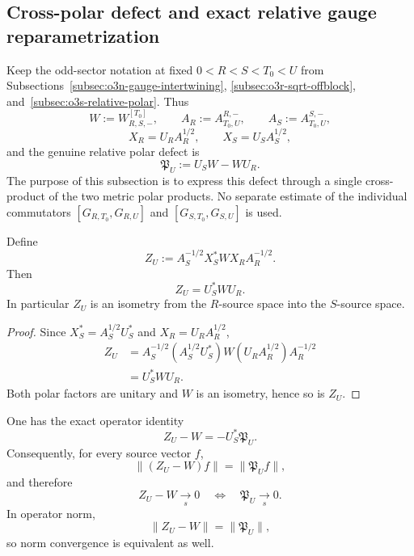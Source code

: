 
\subsection{Cross-polar defect and exact relative gauge reparametrization}
\label{subsec:o3t-crosspolar}

Keep the odd-sector notation at fixed $0<R<S<T_0<U$ from
Subsections~\ref{subsec:o3n-gauge-intertwining},
\ref{subsec:o3r-sqrt-offblock}, and~\ref{subsec:o3s-relative-polar}.  Thus
\[
 W:=W_{R,S,-}^{[T_0]},
 \qquad
 A_R:=A_{T_0,U}^{R,-},
 \qquad
 A_S:=A_{T_0,U}^{S,-},
\]
\[
 X_R=U_RA_R^{1/2},
 \qquad
 X_S=U_SA_S^{1/2},
\]
and the genuine relative polar defect is
\[
 \mathfrak P_U:=U_SW-WU_R.
\]
The purpose of this subsection is to express this defect through a single cross-product
of the two metric polar products.  No separate estimate of the individual commutators
$[G_{R,T_0},G_{R,U}]$ and $[G_{S,T_0},G_{S,U}]$ is used.

\begin{proposition}
\label{prop:o3t-crosspolar}
Define
\[
 \boxed{
 Z_U
 :=A_S^{-1/2}X_S^*WX_RA_R^{-1/2}.
 }
\]
Then
\[
 \boxed{
 Z_U=U_S^*WU_R.
 }
\tag{O3T.1}\label{eq:o3t-Z}
\]
In particular $Z_U$ is an isometry from the $R$-source space into the $S$-source
space.
\end{proposition}

\begin{proof}
Since $X_S^*=A_S^{1/2}U_S^*$ and $X_R=U_RA_R^{1/2}$,
\[
\begin{aligned}
 Z_U
 &=A_S^{-1/2}(A_S^{1/2}U_S^*)W(U_RA_R^{1/2})A_R^{-1/2}\\
 &=U_S^*WU_R.
\end{aligned}
\]
Both polar factors are unitary and $W$ is an isometry, hence so is $Z_U$.
\end{proof}

\begin{proposition}
\label{prop:o3t-gauge-defect}
One has the exact operator identity
\[
 \boxed{
 Z_U-W=-U_S^*\mathfrak P_U.
 }
\tag{O3T.2}\label{eq:o3t-gauge-defect}
\]
Consequently, for every source vector $f$,
\[
 \boxed{
 \|(Z_U-W)f\|=\|\mathfrak P_Uf\|,
 }
\tag{O3T.3}\label{eq:o3t-vector-norm}
\]
and therefore
\[
 \boxed{
 Z_U-W\xrightarrow[s]{}0
 \quad\Longleftrightarrow\quad
 \mathfrak P_U\xrightarrow[s]{}0.
 }
\tag{O3T.4}\label{eq:o3t-strong-equivalence}
\]
In operator norm,
\[
 \boxed{
 \|Z_U-W\|=\|\mathfrak P_U\|,
 }
\tag{O3T.5}\label{eq:o3t-norm-equality}
\]
so norm convergence is equivalent as well.
\end{proposition}

